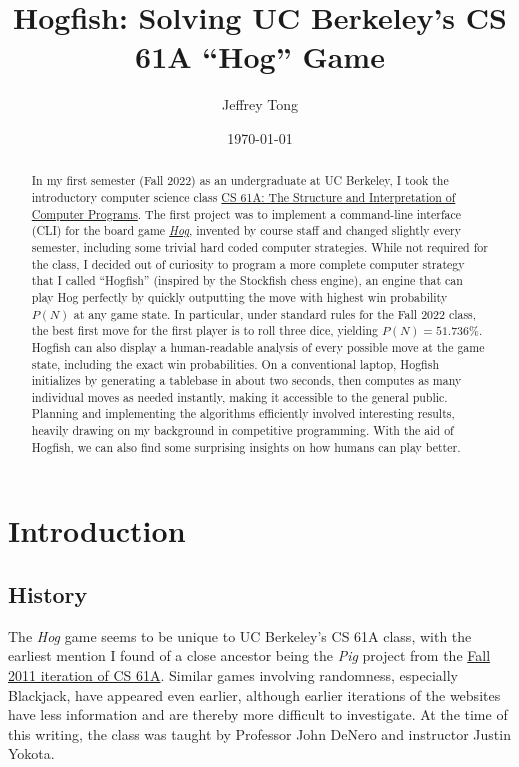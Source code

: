 \documentclass[12 pt]{article}
\title{Hogfish: Solving UC Berkeley's CS 61A ``Hog'' Game}
\author{Jeffrey Tong}
\date{\today}
\begin{document}
	\maketitle
	\thispagestyle{empty}

	\begin{abstract}
		In my first semester (Fall 2022) as an undergraduate at UC Berkeley, I took the introductory computer science class \href{https://inst.eecs.berkeley.edu/~cs61a/fa22/}{CS 61A: The Structure and Interpretation of Computer Programs}. The first project was to implement a command-line interface (CLI) for the board game \href{https://inst.eecs.berkeley.edu/~cs61a/fa22/proj/hog/}{\textit{Hog}}, invented by course staff and changed slightly every semester, including some trivial hard coded computer strategies. While not required for the class, I decided out of curiosity to program a more complete computer strategy that I called ``Hogfish'' (inspired by the Stockfish chess engine), an engine that can play Hog perfectly by quickly outputting the move with highest win probability $P(N)$ at any game state. In particular, under standard rules for the Fall 2022 class, the best first move for the first player is to roll three dice, yielding $P(N) = 51.736\%$. Hogfish can also display a human-readable analysis of every possible move at the game state, including the exact win probabilities. On a conventional laptop, Hogfish initializes by generating a tablebase in about two seconds, then computes as many individual moves as needed instantly, making it accessible to the general public. Planning and implementing the algorithms efficiently involved interesting results, heavily drawing on my background in competitive programming. With the aid of Hogfish, we can also find some surprising insights on how humans can play better.
	\end{abstract}

	\tableofcontents

	\newpage

	\section{Introduction}
		\subsection{History}
			The \textit{Hog} game seems to be unique to UC Berkeley's CS 61A class, with the earliest mention I found of a close ancestor being the \textit{Pig} project from the \href{https://inst.eecs.berkeley.edu/~cs61a/fa11/projects/pig/pig.html}{Fall 2011 iteration of CS 61A}. Similar games involving randomness, especially Blackjack, have appeared even earlier, although earlier iterations of the websites have less information and are thereby more difficult to investigate. At the time of this writing, the class was taught by Professor John DeNero and instructor Justin Yokota.
		
\end{document}
